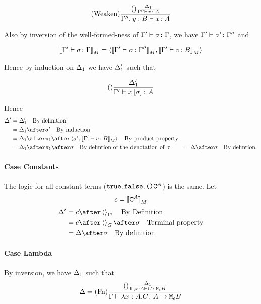\documentclass{report}
\begin{document}
\begin{equation}
    (\text{Weaken}) \frac{(\text{}) \frac{\Delta_1}{\Gamma'' \vdash x \colon A}}{\Gamma'',y: B \vdash x \colon A}
\end{equation}

Also by inversion of the well-formed-ness of $\Gamma' \vdash \sigma \colon \Gamma$, we have $\Gamma' \vdash \sigma' \colon \Gamma''$ and 

\begin{equation}
    {\bf [\![}\Gamma' \vdash \sigma \colon \Gamma{\bf ]\!]}_M = \left\langle{\bf [\![}\Gamma' \vdash \sigma \colon \Gamma''{\bf ]\!]}_M, {\bf [\![}\Gamma' \vdash v \colon B{\bf ]\!]}_M\right\rangle
\end{equation}

Hence by induction on $\Delta_1$ we have $\Delta_1'$ such that

\begin{equation}
    (\text{}) \frac{\Delta_1'}{\Gamma' \vdash x\left[\sigma\right] \colon A}
\end{equation}



Hence
\begin{align}
    \D' & = \D_1' \qt{By definition}\\
        & = \D_1\after\si'\qt{By induction}\\
        & = \D_1\after\p\after\pr{\si'}{\deno{\typerelation{\G'}{v}{B}}}\qt{By product property}\\
        & = \D_1\after\p\after\si\qt{By defintion of the denotation of $\si$}
        & = \D\after\si\qt{By defintion.}
\end{align}

\paragraph{Case Constants}
The logic for all constant terms ($\texttt{true},\texttt{false},\texttt{()}\texttt{C}^{A}$) is the same.
Let
\begin{equation}
    c = {\bf [\![}\texttt{C}^{A}{\bf ]\!]}_M
\end{equation}
\begin{align}
    \D' & = c\after\term{\G'}\qt{By Definition}\\
        & = c\after\term{G}\after\si\qt{Terminal property}\\
        & = \D\after\si\qt{By definition}
\end{align}
\paragraph{Case Lambda}

By inversion, we have $\Delta_1$ such that
\begin{equation}
    \Delta = (\text{Fn}) \frac{
        (\text{}) \frac{\Delta_1}{\Gamma, x:A \vdash C \colon \texttt{M}_{\epsilon}{B}}
    }{\Gamma \vdash \lambda x : A. C \colon A \rightarrow \texttt{M}_{\epsilon}{B}}
\end{equation}
\end{document}
